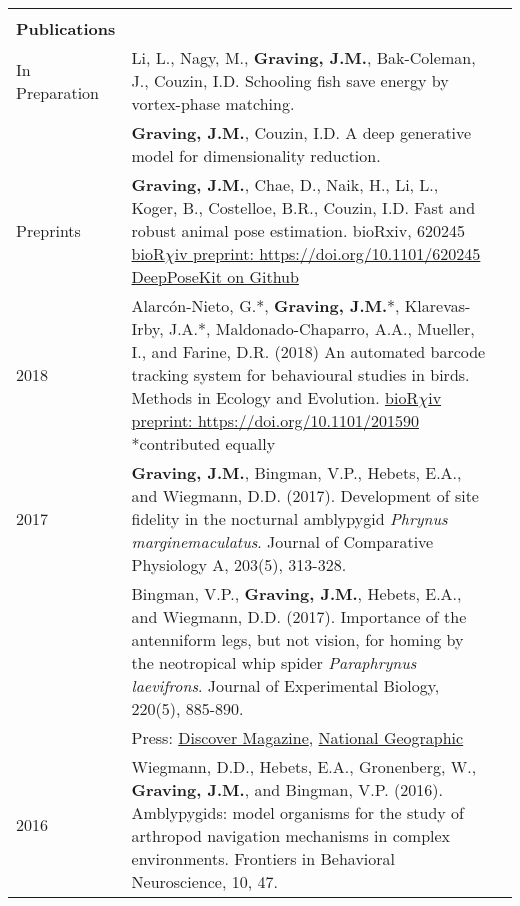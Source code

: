 \documentclass[letterpaper,7pt,oneside]{article}
\begin{document}
\begin{small}
\begin{longtable}{@{} l p{5.3in}l}
     & \\
 \Large{\textbf{Publications}}  \vspace{5mm} \\
\large{In Preparation}
& Li, L., Nagy, M., \textbf{Graving, J.M.}, Bak-Coleman, J., Couzin, I.D. Schooling fish save energy by vortex-phase matching. \\
& \textbf{Graving, J.M.}, Couzin, I.D.  A deep generative model for dimensionality reduction. \vspace{1mm} \\
\large{Preprints}
& \textbf{Graving, J.M.}, Chae, D., Naik, H., Li, L., Koger, B., Costelloe, B.R., Couzin, I.D. Fast and robust animal pose estimation.  bioRxiv, 620245 \href{https://doi.org/10.1101/620245}{bioR$\chi$iv preprint: https://doi.org/10.1101/620245} \href{https://github.com/jgraving/deepposekit}{DeepPoseKit on Github}\vspace{1mm} \\
\large{2018}
& Alarc\'{o}n-Nieto, G.*, \textbf{Graving, J.M.}*, Klarevas-Irby, J.A.*, Maldonado-Chaparro, A.A., Mueller, I., and Farine, D.R. (2018) An automated barcode tracking system for behavioural studies in birds. Methods in Ecology and Evolution. \href{https://doi.org/10.1101/201590}{bioR$\chi$iv preprint: https://doi.org/10.1101/201590}  \small{*contributed equally}  \vspace{1mm} \\
\large{2017}
& \textbf{Graving, J.M.}, Bingman, V.P., Hebets, E.A., and Wiegmann, D.D. (2017). Development of site fidelity in the nocturnal amblypygid \textit{Phrynus marginemaculatus}. Journal of Comparative Physiology A, 203(5), 313-328. \vspace{1mm} \\
& Bingman, V.P., \textbf{Graving, J.M.}, Hebets, E.A., and Wiegmann, D.D. (2017). Importance of the antenniform legs, but not vision, for homing by the neotropical whip spider \textit{Paraphrynus laevifrons}. Journal of Experimental Biology, 220(5), 885-890.  \\
&Press: \href{http://blogs.discovermagazine.com/inkfish/2017/01/24/whip-spiders-use-their-feet-to-smell-their-way-home}{Discover Magazine}, 
\href{https://www.youtube.com/watch?v=eUoFegXxmfo}{National Geographic} \vspace{1mm} \\
\large{2016}
& Wiegmann, D.D., Hebets, E.A., Gronenberg, W., \textbf{Graving, J.M.}, and Bingman, V.P. (2016). Amblypygids: model organisms for the study of arthropod navigation mechanisms in complex environments. Frontiers in Behavioral Neuroscience, 10, 47. \vspace{1mm} \\   


\end{longtable}
\end{small}
\end{document}
